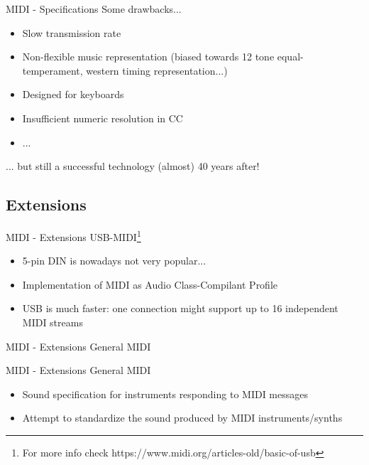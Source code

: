 \documentclass{beamer}
\begin{document}
\begin{frame}{MIDI - Specifications}
    Some drawbacks...\\
    \begin{itemize}
        \item Slow transmission rate
        \item Non-flexible music representation (biased towards 12 tone equal-temperament, western timing representation...)
        \item Designed for keyboards
        \item Insufficient numeric resolution in CC
        \item ...
    \end{itemize}
    ... but still a successful technology (almost) 40 years after!
\end{frame}


\subsection{Extensions}

\begin{frame}{MIDI - Extensions}
    USB-MIDI\footnote{For more info check https://www.midi.org/articles-old/basic-of-usb}\\
    \vspace{5mm}
    \begin{itemize}
        \item 5-pin DIN is nowadays not very popular...\\
        \item Implementation of MIDI as Audio Class-Compilant Profile
        \item USB is much faster: one connection might support up to 16 independent MIDI streams 
    \end{itemize}
\end{frame}

\begin{frame}{MIDI - Extensions}
    General MIDI\\
    \vspace{5mm}
\end{frame}

\begin{frame}{MIDI - Extensions}
    General MIDI\\
    \vspace{5mm}
    \begin{itemize}
        \item Sound specification for instruments responding to MIDI messages
        \item Attempt to standardize the sound produced by MIDI instruments/synths
    \end{itemize}
\end{frame}
\end{document}

